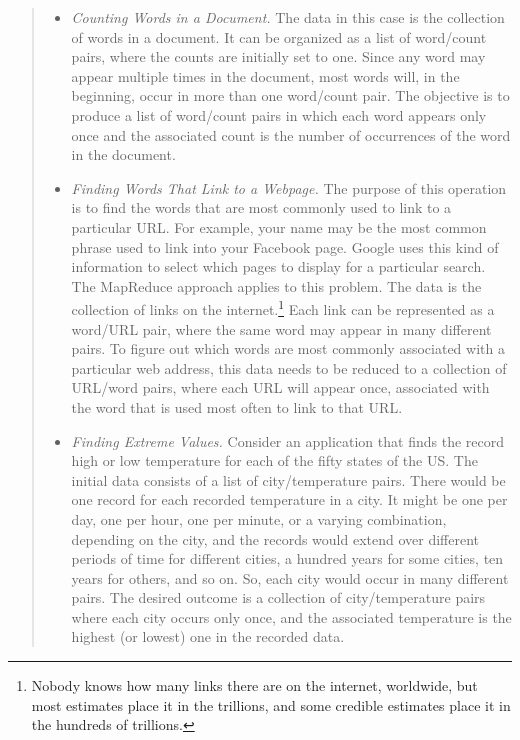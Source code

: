 \begin{quote}
\begin{itemize}
\item \emph{Counting Words in a Document.}  The data in this
case is the collection of words in a document.  It can be
organized as a list of word/count pairs, where the counts
are initially set to one.  Since any word may appear
multiple times in the document, most words will, in the beginning,
occur in more than one word/count pair.
The objective is to produce a list of word/count pairs
in which each word appears only once and the associated
count is the number of occurrences of
the word in the document.

\item \emph{Finding Words That Link to a Webpage.}  The
purpose of this operation is to find the words that are
most commonly used to link to a particular URL.
For example, your name may be the most
common phrase used to link into your Facebook page.
Google uses this kind of information to select which
pages to display for a particular search.
The MapReduce approach applies to this problem.
The data is the
collection of links on the internet.\footnote{Nobody knows how many
links there are on the internet, worldwide,
but most estimates place it in the trillions,
and some credible estimates place it in the hundreds of trillions. }
Each link can be represented as a word/URL pair,
where the same word may appear in many different pairs.
To figure out which words are most commonly associated with
a particular web address,
this data needs to be reduced to a collection of
URL/word pairs, where each URL will appear once, associated
with the word that is used most often to link to that URL.

\item \emph{Finding Extreme Values.}  Consider
an application that finds the record high or low temperature
for each of the fifty states of the US.
The initial data consists of a list of
city/temperature pairs.  There would be one record for each
recorded temperature in a city. It might be one per day,
one per hour, one per minute, or a varying combination,
depending on the city, and the records would extend over
different periods of time for different cities,
a hundred years for some cities, ten years for others,
and so on. So, each city would occur in many different pairs.
The desired outcome is a collection of city/temperature
pairs where each city occurs only once, and the associated
temperature is the highest (or lowest) one in the recorded data.
\end{itemize}
\end{quote}

